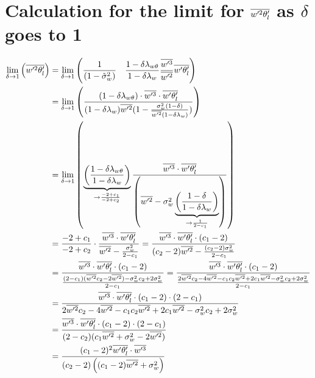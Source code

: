 \section{Calculation for the limit for \texorpdfstring{$\overline{w'^2 \theta_l'}$}{wprime2thetalprimebar} as \texorpdfstring{$\delta$}{delta} goes to 1}
\label{sec:calculation-for-the-limit-for-wprime2thetalprimebar-as-delta-goes-to-1}

\begin{align}
    \label{eq:limit_wprime2thetalbar_delta_to_1_calc}
    \lim_{\delta \to 1}\left(\overline{w'^2 \theta_l'}\right)
    &= \lim_{\delta \to 1}\left(
    \frac{1}{\left( 1 - \tilde{\sigma}_w^2 \right)}
    \quad
    \frac{1 - \delta \lambda_{w\theta}}{1-\delta \lambda_w}
    \frac{\overline{w'^3}}{\overline{w'^2}} \overline{w' \theta_l'}
    \right)
    \\
    &= \lim_{\delta \to 1}\left(
    \frac{(1 - \delta \lambda_{w\theta}) \cdot \overline{w'^3} \cdot \overline{w' \theta_l'}}
    {(1-\delta \lambda_w)\overline{w'^2} (1-\frac{\sigma_w^2 (1-\delta)}{\overline{w'^2} (1-\delta\lambda_w)})}
    \right)
    \\
    &= \lim_{\delta \to 1}\left(
    \underbrace{\left(\frac{1 - \delta \lambda_{w\theta}}{1 - \delta\lambda_w}\right)}_{\to \frac{-2 + c_1}{-2 + c_2}}
    \frac{\overline{w'^3} \cdot \overline{w' \theta_l'}}
    {\left(\overline{w'^2} - \sigma_w^2 \underbrace{\left(\frac{1-\delta}{1-\delta\lambda_w}\right)}_{\to \frac{1}{2 - c_1}}\right)}
    \right)
    \\
    &= \frac{-2 + c_1}{-2 + c_2} \cdot
    \frac{\overline{w'^3} \cdot \overline{w' \theta_l'}}
    {\overline{w'^2} - \frac{\sigma_w^2}{2 - c_1}}
    = \frac{\overline{w'^3} \cdot \overline{w' \theta_l'} \cdot (c_1 - 2)}
    {(c_2 - 2)\overline{w'^2} - \frac{(c_2 - 2)\sigma_w^2}{2 - c_1}} \\
    &= \frac{\overline{w'^3} \cdot \overline{w' \theta_l'} \cdot (c_1 - 2)}
    {\frac{(2 - c_1) (\overline{w'^2} c_2 - 2\overline{w'^2}) - \sigma_w^2 c_2 + 2\sigma_w^2}{2 - c_1}}
    = \frac{\overline{w'^3} \cdot \overline{w' \theta_l'} \cdot (c_1 - 2)}
    {\frac{2\overline{w'^2} c_2 - 4\overline{w'^2} - c_1 c_2 \overline{w'^2} + 2 c_1 \overline{w'^2} - \sigma_w^2 c_2 + 2\sigma_w^2}{2 - c_1}} \\
    &= \frac{\overline{w'^3} \cdot \overline{w' \theta_l'} \cdot (c_1 - 2) \cdot (2 - c_1)}
    {2\overline{w'^2} c_2 - 4\overline{w'^2} - c_1 c_2 \overline{w'^2} + 2 c_1 \overline{w'^2} - \sigma_w^2 c_2 + 2\sigma_w^2} \\
    &= \frac{\overline{w'^3} \cdot \overline{w' \theta_l'} \cdot (c_1 - 2) \cdot (2 - c_1)}
    {(2 - c_2) (c_1\overline{w'^2} + \sigma_w^2 - 2\overline{w'^2})} \\
    &= \frac{(c_1 - 2)^2 \overline{w' \theta_l'} \cdot \overline{w'^3}}{(c_2 - 2)\left((c_1 - 2)\overline{w'^2} + \sigma_w^2\right)}
\end{align}